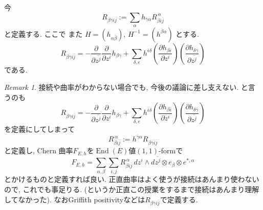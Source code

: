 \documentclass[dvipdfmx,a4paper,11pt]{article} %
\theoremstyle{definition}
\theoremstyle{remark}
\newtheorem{rem}[thm]{Remark}
\numberwithin{equation}{section}
\newcommand{\End}[0]{\operatorname{End}}
\begin{document}
今
\[
R_{\beta \overline{\gamma} i\overline{j}}
:=
\sum_{\alpha} h_{\overline{\gamma}\alpha}
R_{\beta i\overline{j}}^{\,\alpha}
\]
と定義する.
ここで
また \(H=(h_{\alpha\overline{\beta}})\), \(H^{-1}=(h^{\overline{\beta}\alpha})\) とする.
\begin{equation}
R_{\beta \overline{\gamma}i\overline{j}}
=
-
\frac{\partial }{\partial \overline{z^j}}
\frac{\partial }{\partial z^i} 
h_{\beta\overline{\gamma}}
+
\sum_{\delta,\epsilon}h^{\overline{\epsilon}\delta}
\left(\frac{\partial h_{\beta\overline{\epsilon}}}{\partial z^i} \right)
\left(\frac{\partial h_{\delta\overline{\gamma}}}{\partial \overline{z^j}}\right)
\end{equation}
である.

\begin{rem}
接続や曲率がわからない場合でも, 今後の議論に差し支えない. 
と言うのも
\[
R_{\beta \overline{\gamma}i\overline{j}}
=
- 
\frac{\partial }{\partial \overline{z^j}}
\frac{\partial }{\partial z^i} 
h_{\beta\overline{\gamma}}
+
\sum_{\delta,\epsilon}h^{\overline{\epsilon}\delta}
\left(\frac{\partial h_{\beta\overline{\epsilon}}}{\partial z^i} \right)
\left(\frac{\partial h_{\delta\overline{\gamma}}}{\partial \overline{z^j}}\right)
\]
を定義にしてしまって
$$
R_{\beta i\overline{j}}^{\,\alpha}:=h^{\overline{\gamma}\alpha}
R_{\beta \overline{\gamma}i\overline{j}}
$$
と定義し, Chern 曲率$F_{E,h}$を$\End(E)$値$(1,1)$-formで
\[
F_{E,h}
=\sum_{\alpha,\beta}\sum_{i,j} 
R_{\beta i\overline{j}}^{\,\alpha}
\,dz^i\wedge d\overline{z^j} 
\otimes e_{\beta} \otimes e^{*, \alpha}
\]
とかけるものと定義すれば良い. 
 正直曲率はよく使うが接続はあんまり使わないので, これでも事足りる. (というか正直この授業をするまで接続はあんまり理解してなかった). 
 なおGriffith positivityなどは$R_{\beta \overline{\gamma}i\overline{j}}$で定義する. 
\end{rem}
\end{document}
